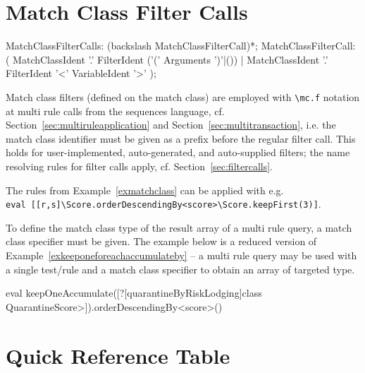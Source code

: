 \section{Match Class Filter Calls}

\begin{rail}
	MatchClassFilterCalls: (backslash MatchClassFilterCall)*;
  MatchClassFilterCall: ( MatchClassIdent '.' FilterIdent ('(' Arguments ')'|()) | MatchClassIdent '.' FilterIdent '<' VariableIdent '>' );
\end{rail}

Match class filters (defined on the match class) are employed with \verb#\mc.f# notation at multi rule calls from the sequences language, cf. Section~\ref{sec:multiruleapplication} and Section~\ref{sec:multitransaction}, i.e. the match class identifier must be given as a prefix before the regular filter call.
This holds for user-implemented, auto-generated, and auto-supplied filters; the name resolving rules for filter calls apply, cf. Section~\ref{sec:filtercalls}.

\begin{example}
The rules from Example~\ref{exmatchclass} can be applied with e.g.\\
\verb#eval [[r,s]\Score.orderDescendingBy<score>\Score.keepFirst(3)]#.
\end{example}

To define the match class type of the result array of a multi rule query, a match class specifier must be given.
The example below is a reduced version of Example~\ref{exkeeponeforeachaccumulateby} -- a multi rule query may be used with a single test/rule and a match class specifier to obtain an array of targeted type.

\begin{example}
	\begin{grshell}
	eval keepOneAccumulate([?[quarantineByRiskLodging]\<class QuarantineScore>]).orderDescendingBy<score>()
	\end{grshell}
\end{example}

\pagebreak

\section{Quick Reference Table}

